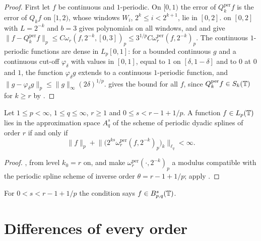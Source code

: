 \begin{proof}
\leanok
First let $f$ be continuous and $1$-periodic. On $[0, 1)$ the error of $Q_k^{\mathrm{per}} f$ is
the error of $Q_k f$ on $[1, 2)$, whose windows $W_i$, $2^k \leq i < 2^{k+1}$, lie in $[0, 2]$.
 on $[0, 2]$ with $L = 2^{-k}$ and $b = 3$ gives polynomials on all
windows, and  and  give
$\|f - Q_k^{\mathrm{per}} f\|_p \leq C \omega_r(f, 2^{-k}, [0, 3])_p
\leq 3^{1/p} C \omega_r^{\mathrm{per}}(f, 2^{-k})_p$. The continuous $1$-periodic functions are
dense in $L_p[0,1]$: for a bounded continuous $g$ and a continuous cut-off $\varphi_\delta$ with
values in $[0, 1]$, equal to $1$ on $[\delta, 1 - \delta]$ and to $0$ at $0$ and $1$, the function
$\varphi_\delta g$ extends to a continuous $1$-periodic function, and
$\|g - \varphi_\delta g\|_p \leq \|g\|_\infty (2\delta)^{1/p}$.  gives the
bound for all $f$, since $Q_k^{\mathrm{per}} f \in S_k(\mathbb{T})$ for $k \geq r$ by .
\end{proof}

\begin{theorem}
\label{thm:per-spline-besov}
\leanok
{}
Let $1 \leq p < \infty$, $1 \leq q \leq \infty$, $r \geq 1$ and $0 \leq s < r - 1 + 1/p$. A
function $f \in L_p(\mathbb{T})$ lies in the approximation space $A^s_q$ of the scheme of periodic dyadic
splines of order $r$ if and only if
\[
  \|f\|_p + \bigl\| \bigl( 2^{ks} \omega_r^{\mathrm{per}}(f, 2^{-k})_p \bigr)_k \bigr\|_{\ell_q}
  < \infty .
\]
\end{theorem}

\begin{proof}
\leanok
{}, from level $k_0 = r$ on, and  make
$\omega_r^{\mathrm{per}}(\cdot, 2^{-k})_p$ a modulus compatible with the periodic spline scheme of
inverse order $\theta = r - 1 + 1/p$; apply .
\end{proof}

For $0 < s < r - 1 + 1/p$ the condition says $f \in B^{s}_{p,q}(\mathbb{T})$.

\section{Differences of every order}

